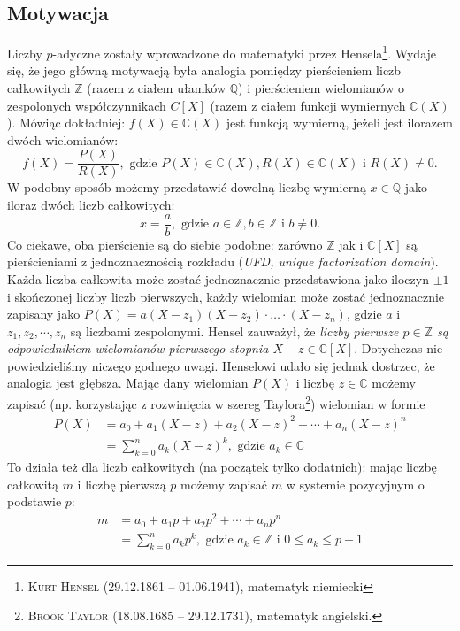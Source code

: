 \documentclass[a4paper,fleqn]{article}
\begin{document}
\begin{multicols}{2}
\section{Motywacja}
Liczby $p$-adyczne zostały wprowadzone do matematyki przez Hensela\footnote{\textsc{Kurt Hensel} (29.12.1861 -- 01.06.1941), matematyk niemiecki}.
Wydaje się, że jego główną motywacją była analogia pomiędzy pierścieniem liczb całkowitych $\mathbb Z$ (razem z ciałem ułamków $\mathbb Q$) i pierścieniem wielomianów o zespolonych współczynnikach $C[X]$ (razem z ciałem funkcji wymiernych $\mathbb C(X)$). Mówiąc dokładniej: $f(X) \in \mathbb C(X)$ jest funkcją wymierną, jeżeli jest ilorazem dwóch wielomianów: \[f(X) = \frac{P(X)}{R(X)}, \text{ gdzie } P(X)\in \mathbb C(X), R(X)\in \mathbb C(X) \text { i } R(X) \neq 0.\]
W podobny sposób możemy przedstawić dowolną liczbę wymierną $x \in \mathbb Q$ jako iloraz dwóch liczb całkowitych: \[x = \frac{a}{b}, \text{ gdzie } a\in \mathbb Z, b \in \mathbb Z \text { i } b \neq 0.\]
Co ciekawe, oba pierścienie są do siebie podobne: zarówno $\mathbb Z$ jak i $\mathbb C[X]$ są pierścieniami z jednoznacznością rozkładu (\emph{UFD, unique factorization domain}). Każda liczba całkowita może zostać jednoznacznie przedstawiona jako iloczyn $\pm 1$ i skończonej liczby liczb pierwszych, każdy wielomian może zostać jednoznacznie zapisany jako $P(X) = a(X - z_1)(X - z_2)\cdot\ldots\cdot(X - z_n)$, gdzie $a$ i $z_1, z_2, \cdots, z_n$ są liczbami zespolonymi. Hensel zauważył, że \emph{liczby pierwsze $p\in\mathbb Z$ są odpowiednikiem wielomianów pierwszego stopnia $X - z \in \mathbb C[X]$}. Dotychczas nie powiedzieliśmy niczego godnego uwagi. Henselowi udało się jednak dostrzec, że analogia jest głębsza. Mając dany wielomian $P(X)$ i liczbę $z \in \mathbb C$ możemy zapisać (np. korzystając z rozwinięcia w szereg Taylora\footnote{\textsc{Brook Taylor} (18.08.1685 -- 29.12.1731), matematyk angielski.}) wielomian w formie
\begin{align*}
P(X) & = a_0 + a_1(X-z) + a_2(X-z)^2 + \cdots + a_n(X-z)^n \\
& = \sum_{k=0}^n a_k(X-z)^k, \text{ gdzie } a_k \in\mathbb C
\end{align*}
To działa też dla liczb całkowitych (na początek tylko dodatnich): mając liczbę całkowitą $m$ i liczbę pierwszą $p$ możemy zapisać $m$ w systemie pozycyjnym o podstawie $p$:
\begin{align*}
m & = a_0 + a_1p+ a_2p^2 + \cdots + a_np^n \\
&  = \sum_{k=0}^n a_kp^k, \text{ gdzie } a_k \in\mathbb Z \text{ i } 0 \le a_k \le p-1
\end{align*}


\end{multicols}
\end{document}
